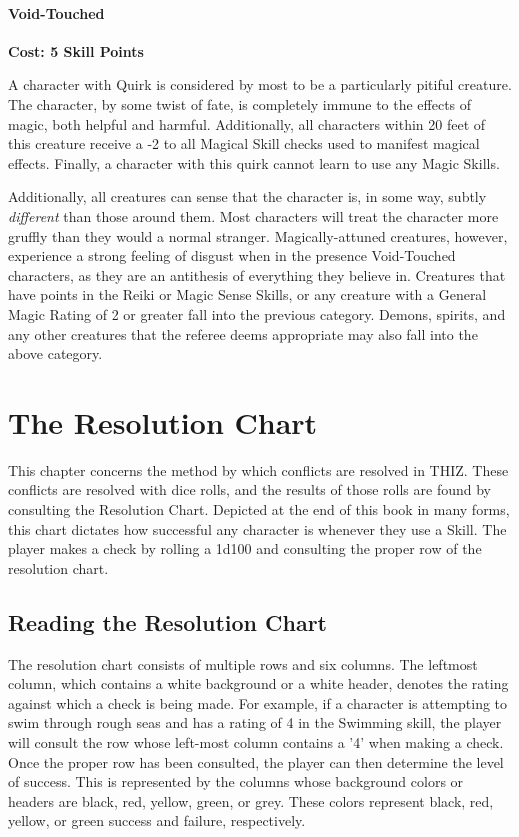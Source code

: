 \documentclass[oneside]{book}
\begin{document}
\begin{multicols}{2}
\subsubsection{Void-Touched}
\textbf{\small Cost: 5 Skill Points}

A character with Quirk is considered by most to be a particularly pitiful creature. The character, by some twist of fate, is completely immune to the effects of magic, both helpful and harmful. Additionally, all characters within 20 feet of this creature receive a -2 to all Magical Skill checks used to manifest magical effects. Finally, a character with this quirk cannot learn to use any Magic Skills.

Additionally, all creatures can sense that the character is, in some way, subtly \emph{different} than those around them. Most characters will treat the character more gruffly than they would a normal stranger. Magically-attuned creatures, however, experience a strong feeling of disgust when in the presence Void-Touched characters, as they are an antithesis of everything they believe in. Creatures that have points in the Reiki or Magic Sense Skills, or any creature with a General Magic Rating of 2 or greater fall into the previous category. Demons, spirits, and any other creatures that the referee deems appropriate may also fall into the above category.
\end{multicols}

\chapter{The Resolution Chart}
This chapter concerns the method by which conflicts are resolved in THIZ. These conflicts are resolved with dice rolls, and the results of those rolls are found by consulting the Resolution Chart. Depicted at the end of this book in many forms, this chart dictates how successful any character is whenever they use a Skill. The player makes a check by rolling a 1d100 and consulting the proper row of the resolution chart.

\section{Reading the Resolution Chart}
The resolution chart consists of multiple rows and six columns. The leftmost column, which contains a white background or a white header, denotes the rating against which a check is being made. For example, if a character is attempting to swim through rough seas and has a rating of 4 in the Swimming skill, the player will consult the row whose left-most column contains a '4' when making a check. Once the proper row has been consulted, the player can then determine the level of success. This is represented by the columns whose background colors or headers are black, red, yellow, green, or grey. These colors represent black, red, yellow, or green success and failure, respectively. 
\end{document}
